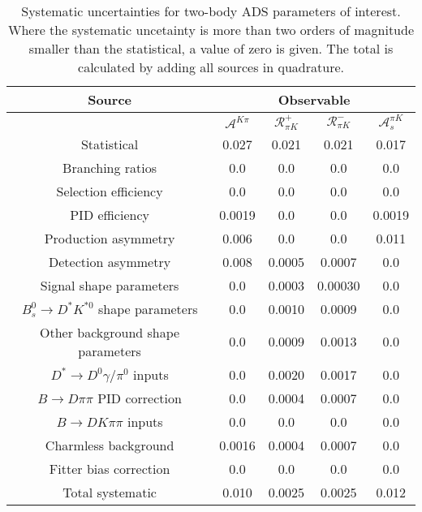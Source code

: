 \begin{sidewaystable}
  \centering
  \begin{tabular}{ccccc}
      \toprule
      Source & \multicolumn{4}{c}{Observable} \\
      \midrule
       & $\mathcal{A}^{K\pi}$ & $\mathcal{R}_{\pi K}^+$ & $\mathcal{R}_{\pi K}^-$ & $\mathcal{A}_s^{\pi K}$ \\
      \midrule
      Statistical & 0.027 & 0.021 & 0.021 & 0.017 \\
      \midrule
      Branching ratios & 0.0  & 0.0  & 0.0  & 0.0  \\
      Selection efficiency & 0.0  & 0.0  & 0.0  & 0.0  \\
      PID efficiency & 0.0019 & 0.0  & 0.0  & 0.0019 \\
      Production asymmetry & 0.006 & 0.0  & 0.0  & 0.011 \\
      Detection asymmetry & 0.008 & 0.0005 & 0.0007 & 0.0  \\
      Signal shape parameters & 0.0  & 0.0003 & 0.00030 & 0.0  \\
      $B^0_s \to D^* K^{*0}$ shape parameters & 0.0  & 0.0010 & 0.0009 & 0.0  \\
      Other background shape parameters & 0.0  & 0.0009 & 0.0013 & 0.0  \\
      $D^* \to D^0 \gamma/\pi^0$ inputs & 0.0  & 0.0020 & 0.0017 & 0.0  \\
      $B\to D\pi\pi$ PID correction & 0.0  & 0.0004 & 0.0007 & 0.0  \\
      $B\to DK\pi\pi$ inputs & 0.0  & 0.0  & 0.0  & 0.0  \\
      Charmless background & 0.0016 & 0.0004 & 0.0007 & 0.0  \\
      Fitter bias correction & 0.0  & 0.0  & 0.0  & 0.0  \\
      \midrule
      Total systematic & 0.010 & 0.0025 & 0.0025 & 0.012 \\
      \bottomrule
  \end{tabular}
  \caption{Systematic uncertainties for two-body ADS parameters of interest. Where the systematic uncetainty is more than two orders of magnitude smaller than the statistical, a value of zero is given. The total is calculated by adding all sources in quadrature.}
\label{tab:twoBody_ADS_systematics}
\end{sidewaystable}
